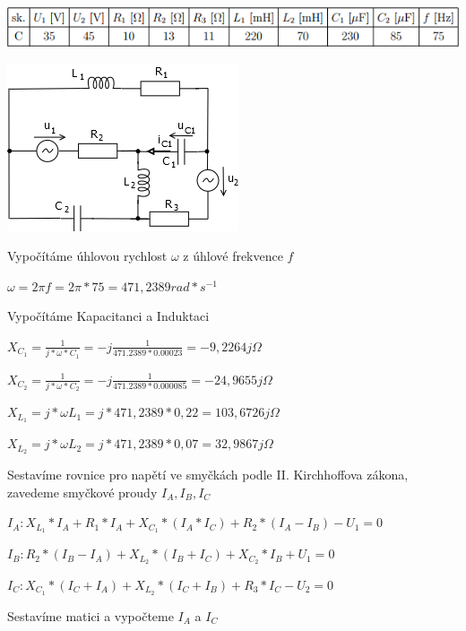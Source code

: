 \documentclass{article}
\begin{document}
\vspace{1pc}
\centerline{\includegraphics{hodnoty4}}
\vspace{2pc}
\centerline{\includegraphics{zadani4}}
\vspace{2pc}


\noindent Vypočítáme úhlovou rychlost $\omega$ z úhlové frekvence $f$

\vspace{1pc}
\centerline{$\omega = 2\pi f = 2\pi*75 = 471,2389rad*s^{-1} $}
\vspace{2pc}

\noindent Vypočítáme Kapacitanci a Induktaci
\centerline{$X_{C_1} = \frac{1}{j*\omega*C_1} = - j\frac{1}{471.2389*0.00023} = -9,2264j\Omega$}
\centerline{$X_{C_2} = \frac{1}{j*\omega*C_2} = - j\frac{1}{471.2389*0.000085} = -24,9655j\Omega$}
\centerline{$X_{L_1} = j*\omega L_1 = j*471,2389*0,22 = 103,6726j\Omega$}
\centerline{$X_{L_2} = j*\omega L_2 = j*471,2389*0,07 = 32,9867j\Omega$}

\clearpage
\noindent Sestavíme rovnice pro napětí ve smyčkách podle II. Kirchhoffova zákona, zavedeme smyčkové proudy $I_A,I_B,I_C$

\vspace{1pc}
\centerline{$I_A : X_{L_1}*I_A+R_1*I_A+X_{C_1}*(I_A*I_C)+R_2*(I_A-I_B)-U_1=0$}
\centerline{$I_B : R_2*(I_B-I_A) +X_{L_2}*(I_B+I_C)+X_{C_2}*I_B+U_1=0$}
\centerline{$I_C : X_{C_1}*(I_C+I_A)+X_{L_2}*(I_C+I_B)+R_3*I_C-U_2=0$}
\vspace{2pc}

\noindent Sestavíme matici a vypočteme $I_A$ a $I_C$
\end{document}
